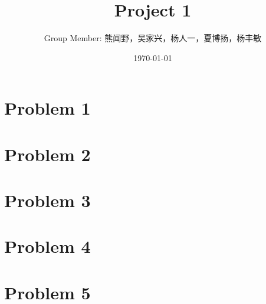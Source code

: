 \documentclass{article}
\title{\textbf{Project 1}}
\author{
	Group Member: 熊闻野，吴家兴，杨人一，夏博扬，杨丰敏
    }
\date{\today}
\begin{document}
\begin{CJK}{UTF8}{gbsn} 
\maketitle

\section*{Problem 1}

\section*{Problem 2}

\section*{Problem 3}

\section*{Problem 4}

\section*{Problem 5}

% 



\end{CJK}
\end{document}
